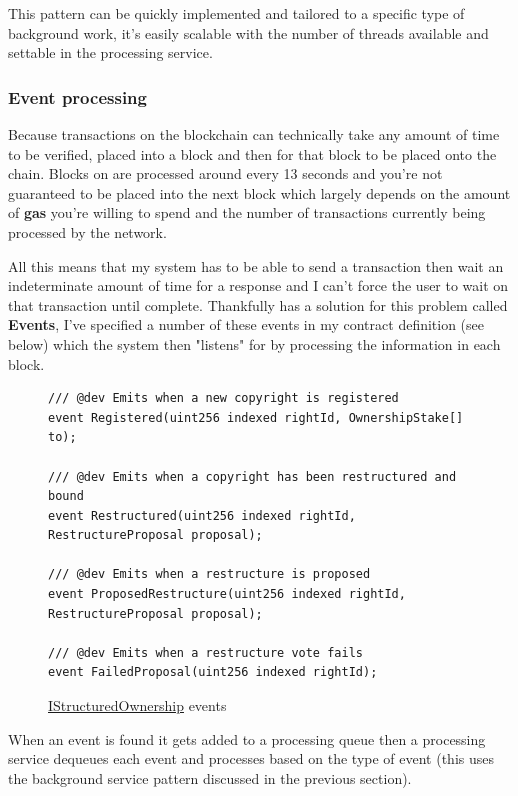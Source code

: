 This pattern can be quickly implemented and tailored to a specific type of background work, it's easily scalable with the number of threads available and settable in the processing service.

\subsubsection{Event processing}

Because transactions on the blockchain can technically take any amount of time to be verified, placed into a block and then for that block to be placed onto the chain. Blocks on  are processed around every 13 seconds and you're not guaranteed to be placed into the next block which largely depends on the amount of \textbf{gas} you're willing to spend and the number of transactions currently being processed by the network.

All this means that my system has to be able to send a transaction then wait an indeterminate amount of time for a response and I can't force the user to wait on that transaction until complete. Thankfully  has a solution for this problem called \textbf{Events}, I've specified a number of these events in my contract definition (see below) which the system then "listens" for by processing the information in each block.

\begin{figure}[H]
\caption{\href{https://github.com/MrHarrisonBarker/CRPL/blob/main/CRPL.Contracts/contracts/IStructuredOwnership.sol}{IStructuredOwnership} events}
\begin{lstlisting}[language=Solidity]
/// @dev Emits when a new copyright is registered
event Registered(uint256 indexed rightId, OwnershipStake[] to);

/// @dev Emits when a copyright has been restructured and bound
event Restructured(uint256 indexed rightId, RestructureProposal proposal);

/// @dev Emits when a restructure is proposed
event ProposedRestructure(uint256 indexed rightId, RestructureProposal proposal);

/// @dev Emits when a restructure vote fails
event FailedProposal(uint256 indexed rightId);
\end{lstlisting}
\end{figure}

When an event is found it gets added to a processing queue then a processing service dequeues each event and processes based on the type of event (this uses the background service pattern discussed in the previous section).


